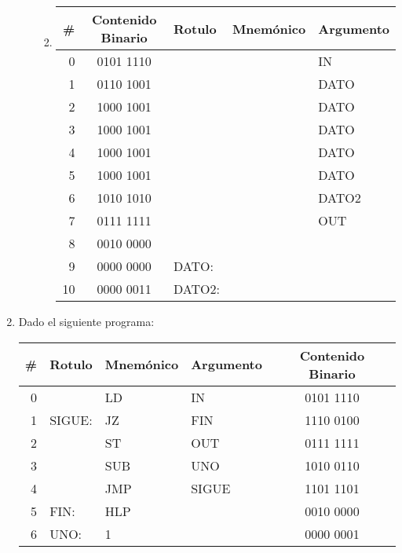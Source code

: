 \documentclass[12pt]{article}
\begin{document}
\begin{enumerate}
\begin{enumerate}
\begin{enumerate}
\begin{tabular}{|r||c||l|l|l|}
                \end{tabular}

                \item \begin{tabular}{|r||c||l|l|l|}

                    \hline

                    \textbf{\#} & \textbf{Contenido Binario} & \textbf{Rotulo}
                    & \textbf{Mnemónico} & \textbf{Argumento} \\
                    \hline
                    \hline

                    0 & 0101 1110 & & & IN\\ \hline
                    1 & 0110 1001 & & & DATO\\ \hline
                    2 & 1000 1001 & & & DATO\\ \hline
                    3 & 1000 1001 & & & DATO\\ \hline
                    4 & 1000 1001 & & & DATO\\ \hline
                    5 & 1000 1001 & & & DATO\\ \hline
                    6 & 1010 1010 & & & DATO2\\ \hline
                    7 & 0111 1111 & & & OUT\\ \hline
                    8 & 0010 0000 & & & \\ \hline
                    9 & 0000 0000 & DATO: & & \\ \hline
                    10 & 0000 0011 & DATO2: & & \\ \hline

                \end{tabular}

            \end{enumerate}
        \end{enumerate}

    \item Dado el siguiente programa:

        \begin{tabular}{|r||l|l|l||c|}

            \hline

            \textbf{\#} & \textbf{Rotulo} & \textbf{Mnemónico} &
            \textbf{Argumento} & \textbf{Contenido Binario} \\
            \hline
            \hline

            0 & & LD & IN & 0101 1110\\ \hline
            1 & SIGUE: & JZ & FIN & 1110 0100\\ \hline
            2 & & ST & OUT & 0111 1111\\ \hline
            3 & & SUB & UNO & 1010 0110\\ \hline
            4 & & JMP & SIGUE & 1101 1101\\ \hline
            5 & FIN: & HLP & & 0010 0000\\ \hline
            6 & UNO: & 1 & & 0000 0001\\ \hline


\end{tabular}
\end{enumerate}
\end{document}
